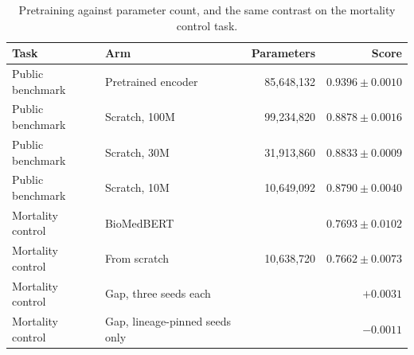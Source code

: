 \begin{table}[H]
\caption[Pretraining gap versus parameter count]{Pretraining against parameter count, and the same contrast on the
mortality control task.}
\centering
\small
\begin{tabular}{llrr}
\toprule
\textbf{Task} & \textbf{Arm} & \textbf{Parameters} & \textbf{Score} \\
\midrule
Public benchmark  & Pretrained encoder & 85,648,132 & $0.9396 \pm 0.0010$ \\
Public benchmark  & Scratch, 100M      & 99,234,820 & $0.8878 \pm 0.0016$ \\
Public benchmark  & Scratch, 30M       & 31,913,860 & $0.8833 \pm 0.0009$ \\
Public benchmark  & Scratch, 10M       & 10,649,092 & $0.8790 \pm 0.0040$ \\
Mortality control  & BioMedBERT         &            & $0.7693 \pm 0.0102$ \\
Mortality control  & From scratch       & 10,638,720 & $0.7662 \pm 0.0073$ \\
Mortality control  & Gap, three seeds each &         & $+0.0031$ \\
Mortality control  & Gap, lineage-pinned seeds only & & $-0.0011$ \\
\bottomrule
\end{tabular}
\label{tab:scaling}
\end{table}
